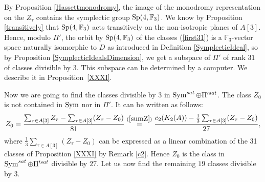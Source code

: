 By Proposition \ref{Hassettmonodromy}, the image of the monodromy representation on the $Z_\tau$ contains the symplectic group $\operatorname{Sp}(4,\mathbb F_3)$. We know by Proposition \ref{transitively} that $\operatorname{Sp}(4,\mathbb F_3)$ acts transitively on the non-isotropic planes of $A[3]$. Hence, modulo $\Pi'$, the orbit by $\operatorname{Sp}(4,\mathbb F_3)$ of the classes (\ref{first31}) is a $\mathbb F_3$-vector space naturally isomorphic to $D$ as introduced in Definition \ref{SymplecticIdeal}, so by Proposition \ref{SymplecticIdealsDimension}, we get a subspace of $\Pi'$ of rank $31$ of classes divisible by $3$.
This subspace can be determined by a computer. We describe it in Proposition~\ref{XXXI}.

Now we are going to find the classes divisible by 3 in $\operatorname{Sym}^{sat}\oplus \Pi'^{sat}$.
The class $Z_0$ is not contained in $\operatorname{Sym}$ nor in $\Pi'$.
It can be written as follows:
$$
Z_0=\frac{\sum_{\tau\in A[3]}Z_\tau-\sum_{\tau\in A[3]}(Z_\tau-Z_0)}{81}
\stackrel{(\ref{sumZ})}{=} \frac{c_2(K_2(A))-\frac{1}{3}\sum_{\tau\in A[3]}(Z_\tau-Z_0)}{27},
$$
where $\frac{1}{3}\sum_{\tau\in A[3]}(Z_\tau-Z_0)$ can be expressed as a linear combination of the 31 classes of Proposition \ref{XXXI} by Remark \ref{c2}.
Hence $Z_0$ is the class in $\operatorname{Sym}^{sat}\oplus \Pi'^{sat}$ divisible by $27$. 
Let us now find the remaining $19$ classes divisible by $3$.


